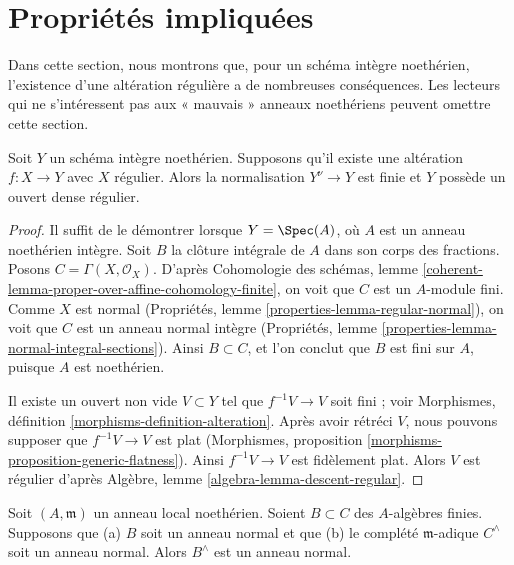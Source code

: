 \section{Propriétés impliquées} \label{section-existence-gives}

\noindent Dans cette section, nous montrons que, pour un schéma intègre noethérien, l'existence d'une altération régulière a de nombreuses conséquences. Les lecteurs qui ne s'intéressent pas aux « mauvais » anneaux noethériens peuvent omettre cette section.

\begin{lemma} \label{lemma-regular-alteration-implies} Soit $Y$ un schéma intègre noethérien. Supposons qu'il existe une altération $f : X \to Y$ avec $X$ régulier. Alors la normalisation $Y^\nu \to Y$ est finie et $Y$ possède un ouvert dense régulier. \end{lemma}

\begin{proof} Il suffit de le démontrer lorsque $Y = \Spec(A)$, où $A$ est un anneau noethérien intègre. Soit $B$ la clôture intégrale de $A$ dans son corps des fractions. Posons $C = \Gamma(X, \mathcal{O}_X)$. D'après Cohomologie des schémas, lemme \ref{coherent-lemma-proper-over-affine-cohomology-finite}, on voit que $C$ est un $A$-module fini. Comme $X$ est normal (Propriétés, lemme \ref{properties-lemma-regular-normal}), on voit que $C$ est un anneau normal intègre (Propriétés, lemme \ref{properties-lemma-normal-integral-sections}). Ainsi $B \subset C$, et l'on conclut que $B$ est fini sur $A$, puisque $A$ est noethérien.

\medskip\noindent Il existe un ouvert non vide $V \subset Y$ tel que $f^{-1}V \to V$ soit fini ; voir Morphismes, définition \ref{morphisms-definition-alteration}. Après avoir rétréci $V$, nous pouvons supposer que $f^{-1}V \to V$ est plat (Morphismes, proposition \ref{morphisms-proposition-generic-flatness}). Ainsi $f^{-1}V \to V$ est fidèlement plat. Alors $V$ est régulier d'après Algèbre, lemme \ref{algebra-lemma-descent-regular}. \end{proof}

\begin{lemma} \label{lemma-algebra-helper} Soit $(A, \mathfrak m)$ un anneau local noethérien. Soient $B \subset C$ des $A$-algèbres finies. Supposons que (a) $B$ soit un anneau normal et que (b) le complété $\mathfrak m$-adique $C^\wedge$ soit un anneau normal. Alors $B^\wedge$ est un anneau normal. \end{lemma}

